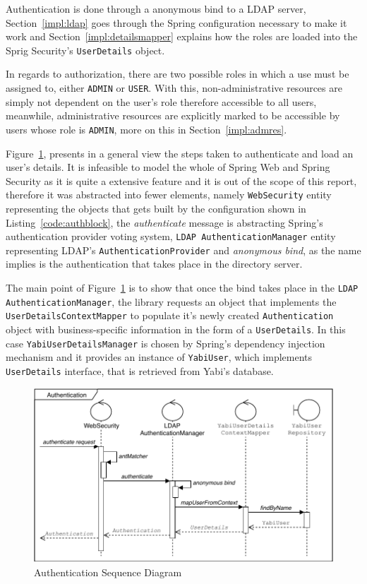 Authentication is done through a anonymous bind to a \gls{LDAP} server, Section~\ref{impl:ldap} goes through the Spring configuration necessary to make it work and Section~\ref{impl:detailsmapper} explains how the roles are loaded into the Sprig Security's \texttt{UserDetails} object.

In regards to authorization, there are two possible roles in which a use must be assigned to, either \texttt{ADMIN} or \texttt{USER}. With this, non-administrative resources are simply not dependent on the user's role therefore accessible to all users, meanwhile, administrative resources are explicitly marked to be accessible by users whose role is \texttt{ADMIN}, more on this in Section~\ref{impl:admres}.

Figure~\ref{fig:authseq}, presents in a general view the steps taken to authenticate and load an user's details. It is infeasible to model the whole of Spring Web and Spring Security as it is quite a extensive feature and it is out of the scope of this report, therefore it was abstracted into fewer elements, namely \texttt{WebSecurity} entity representing the objects that gets built by the configuration shown in Listing~\ref{code:authblock}, the \textit{authenticate} message is abstracting Spring's authentication provider voting system, \texttt{LDAP AuthenticationManager} entity representing \gls{LDAP}'s \texttt{AuthenticationProvider} and \textit{anonymous bind}, as the name implies is the authentication that takes place in the directory server.

The main point of Figure~\ref{fig:authseq} is to show that once the bind takes place in the \texttt{LDAP AuthenticationManager}, the library requests an object that implements the \texttt{UserDetailsContextMapper} to populate it's newly created \texttt{Authentication} object with business-specific information in the form of a \texttt{UserDetails}. In this case \texttt{YabiUserDetailsManager} is chosen by Spring's dependency injection mechanism and it provides an instance of \texttt{YabiUser}, which implements \texttt{UserDetails} interface, that is retrieved from \gls{Yabi}'s database.

\begin{figure}
  \centering
  \includegraphics[width=.9\textwidth]{images/diagramas/authentication}
  \caption{Authentication Sequence Diagram}\label{fig:authseq}
\end{figure}



